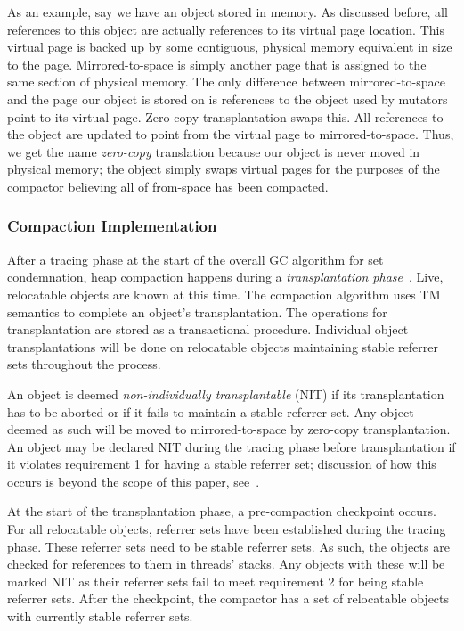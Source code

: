 \documentclass{sig-alternate}
\begin{document}
As an example, say we have an object stored in memory. As discussed before, all references
to this object are actually references to its virtual page location. This virtual page
is backed up by some contiguous, physical memory equivalent in size to the page. 
Mirrored-to-space is simply another page that is assigned to the same section of physical memory. 
The only difference between mirrored-to-space and the page our object is stored on
is references to the object used by mutators point to its virtual page.
Zero-copy transplantation swaps this. All references to the object are
updated to point from the virtual page to mirrored-to-space. 
Thus, we get the name \emph{zero-copy} translation
because our object is never moved in physical memory; the object simply
swaps virtual pages for the purposes of the compactor believing all of from-space
has been compacted.


\subsubsection{Compaction Implementation}
\label{sec:collieAlgorithmImplementation}

After a tracing phase at the start of the overall GC algorithm for set condemnation, heap compaction
happens during a \emph{transplantation phase}~\cite{Iyengar:Collie}.
Live, relocatable objects are known at this time. The compaction 
algorithm uses TM semantics to complete an object's
transplantation. The operations for transplantation are stored as a
transactional procedure. Individual object transplantations will be done on relocatable objects 
maintaining stable referrer sets throughout the process.

An object is deemed \emph{non-individually transplantable} (NIT) if its transplantation
has to be aborted or if it fails to maintain a stable referrer set. 
Any object deemed as such will be moved to mirrored-to-space by zero-copy 
transplantation. An object may be declared NIT during the tracing phase before transplantation
if it violates requirement 1 for having a stable referrer set; discussion
of how this occurs is beyond the scope of this paper, see~\cite{Iyengar:Collie}.

At the start of the transplantation phase, a pre-compaction checkpoint occurs.
For all relocatable objects, referrer sets have been established during the tracing phase.
These referrer sets need to be stable referrer sets. As such, the objects are checked for 
references to them in threads' stacks. Any objects with these will be 
marked NIT as their referrer sets fail to meet requirement 2 for being stable referrer sets.
After the checkpoint, the compactor has a set of relocatable objects with currently stable referrer sets.
\end{document}
